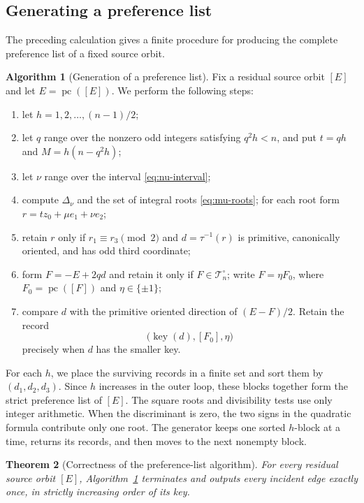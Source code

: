\documentclass[11pt]{amsart}
\newtheorem{theorem}{Theorem}[section]
\theoremstyle{definition}
\newtheorem{algorithm}[theorem]{Algorithm}
\theoremstyle{remark}
\newcommand{\Tres}{\mathcal T_n^{\circ}}
\newcommand{\key}{\operatorname{key}}
\newcommand{\pc}{\operatorname{pc}}
\begin{document}
\subsection{Generating a preference list}

The preceding calculation gives a finite procedure for producing the complete
preference list of a fixed source orbit.

\begin{algorithm}[Generation of a preference list]\label{alg:incident-stream}
Fix a residual source orbit $[E]$ and let $E=\pc([E])$.  We perform the
following steps:

\begin{enumerate}
\item let $h=1,2,\ldots,(n-1)/2$;
\item let $q$ range over the nonzero odd integers satisfying $q^2h<n$, and
put $t=qh$ and $M=h(n-q^2h)$;
\item let $\nu$ range over the interval \eqref{eq:nu-interval};
\item compute $\Delta_\nu$ and the set of integral roots
\eqref{eq:mu-roots}; for each root form
$r=tz_0+\mu e_1+\nu e_2$;
\item retain $r$ only if $r_1\equiv r_3\pmod2$ and
$d=\tau^{-1}(r)$ is primitive, canonically oriented, and has odd third
coordinate;
\item form $F=-E+2qd$ and retain it only if $F\in\Tres$; write
$F=\eta F_0$, where $F_0=\pc([F])$ and $\eta\in\{\pm1\}$;
\item compare $d$ with the primitive oriented direction of $(E-F)/2$.
Retain the record
\[
 \bigl(\key(d),[F_0],\eta\bigr)
\]
precisely when $d$ has the smaller key.
\end{enumerate}

For each $h$, we place the surviving records in a finite set and sort them by
$(d_1,d_2,d_3)$.  Since $h$ increases in the outer loop, these blocks together
form the strict preference list of $[E]$.  The square roots and divisibility
tests use only integer arithmetic.  When the discriminant is zero, the two
signs in the quadratic formula contribute only one root.  The generator keeps one
sorted $h$-block at a time, returns its records, and then moves to the next
nonempty block.
\end{algorithm}

\begin{theorem}[Correctness of the preference-list algorithm]
\label{thm:incident-stream}
For every residual source orbit $[E]$, Algorithm~\ref{alg:incident-stream}
terminates and outputs every incident edge exactly once, in strictly increasing
order of its key.
\end{theorem}
\end{document}
